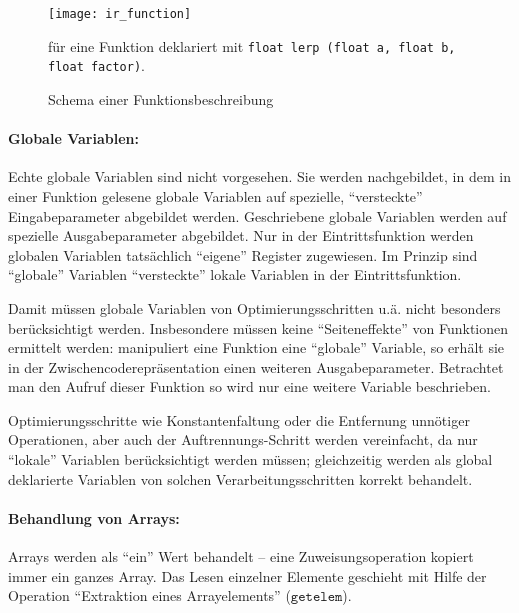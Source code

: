 \documentclass[twoside,a4paper,fleqn,12pt]{book}
\begin{document}
\begin{figure}[h]
   \centering
  \texttt{[image: ir\_function]}
  \caption{Schema einer Funktionsbeschreibung}
  {\small für eine Funktion deklariert mit \texttt{float lerp (float a, float b, float factor)}.}
  \label{fig:ir_function}
\end{figure}

\paragraph{Globale Variablen:}
Echte globale Variablen sind nicht vorgesehen. Sie werden nachgebildet, in dem in einer Funktion gelesene globale Variablen
auf spezielle, "`versteckte"' Eingabeparameter abgebildet werden. Geschriebene globale Variablen werden
auf spezielle Ausgabeparameter abgebildet. Nur in der Eintrittsfunktion werden globalen Variablen tatsächlich
"`eigene"' Register zugewiesen. Im Prinzip sind "`globale"' Variablen "`versteckte"' lokale Variablen in
der Eintrittsfunktion.

Damit müssen globale Variablen von Optimierungsschritten u.ä. nicht besonders berücksichtigt werden.
Insbesondere müssen keine "`Seiteneffekte"' von Funktionen ermittelt werden: manipuliert eine Funktion eine "`globale"' Variable,
so erhält sie in der Zwischencoderepräsentation einen weiteren Ausgabeparameter.
Betrachtet man den Aufruf dieser Funktion so wird nur eine weitere Variable beschrieben.

Optimierungsschritte wie Konstantenfaltung oder die Entfernung unnötiger Operationen, aber auch der Auftrennungs-Schritt werden vereinfacht,
da nur "`lokale"' Variablen berücksichtigt werden müssen; gleichzeitig werden als global deklarierte Variablen
von solchen Verarbeitungsschritten korrekt behandelt.



\paragraph{Behandlung von Arrays:}
Arrays werden als "`ein"' Wert behandelt -- eine Zuweisungsoperation kopiert immer ein ganzes Array.
Das Lesen einzelner Elemente geschieht mit Hilfe der Operation "`Extraktion eines Arrayelements"' ($\mathtt{getelem}$).
\end{document}
